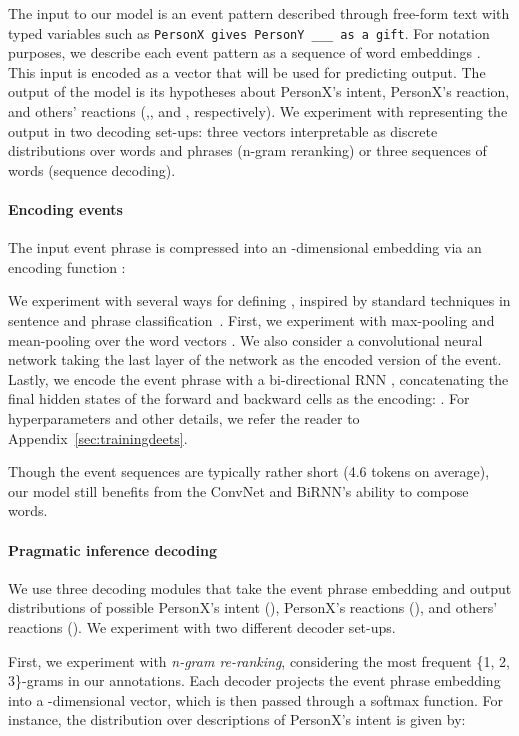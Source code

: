 \documentclass[11pt,a4paper]{article}
\begin{document}
The input to our model is an event pattern described through free-form text with typed variables such as \texttt{PersonX gives PersonY \_\_\_ as a gift}.
For notation purposes, we describe each event pattern  as a sequence of word embeddings .  This input is encoded as a vector  that will be used for predicting output.
The output of the model is its hypotheses about PersonX's intent, PersonX's reaction, and others' reactions (,, and , respectively).  We experiment with representing the output in two decoding set-ups: three vectors interpretable as discrete distributions over words and phrases (n-gram reranking) or three sequences of words (sequence decoding).  


\paragraph{Encoding events}
The input event phrase  is compressed into an -dimensional embedding  via an encoding function :


\noindent
We experiment with several ways for defining , inspired by standard techniques in sentence and phrase classification~\citep{YoonKimPaper}. 
First, we experiment with max-pooling and mean-pooling over the word vectors . 
We also consider a convolutional neural network \citep[ConvNet;][]{lecun1998gradient}
taking the last layer of the network as the encoded version of the event.
Lastly, we encode the event phrase with a bi-directional RNN \citep[specifically, a GRU; ][]{Cho2014}, concatenating the final hidden states of the forward and backward cells as the encoding: . For hyperparameters and other details, we refer the reader to Appendix~\ref{sec:trainingdeets}.

Though the event sequences are typically rather short (4.6 tokens on average), our model still benefits from the ConvNet and BiRNN's ability to compose words. 


\paragraph{Pragmatic inference decoding}
We use three decoding modules that take the event phrase embedding  and output distributions of possible PersonX's intent (), PersonX's reactions (), and others' reactions (). We experiment with two different decoder set-ups.

First, we experiment with \textit{n-gram re-ranking}, considering the  most frequent \{1, 2, 3\}-grams in our annotations.
Each decoder projects the event phrase embedding  into a -dimensional vector, which is then passed through a softmax function. For instance, the distribution over descriptions of PersonX's intent is given by:
 
\end{document}
